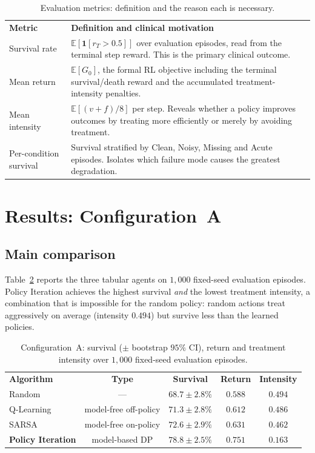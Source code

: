\documentclass[11pt,a4paper]{article}
\newcommand{\tH}[1]{\textcolor{novagreen}{\textbf{#1}}}
\newcommand{\gmid}{\arrayrulecolor{novagreen}\midrule\arrayrulecolor{black}}
\begin{document}
\begin{table}[H]
\centering
\begin{tabularx}{\textwidth}{>{\raggedright\arraybackslash}p{}X}
\toprule
\tH{Metric} & \tH{Definition and clinical motivation} \\
\gmid
Survival rate & $\mathbb{E}[\mathbf{1}[r_T>0.5]]$ over evaluation episodes, read
from the terminal step reward. This is the primary clinical outcome. \\
Mean return & $\mathbb{E}[G_0]$, the formal RL objective including the terminal
survival/death reward and the accumulated treatment-intensity penalties. \\
Mean intensity & $\mathbb{E}[(v+f)/8]$ per step. Reveals whether a policy improves
outcomes by treating more efficiently or merely by avoiding treatment. \\
Per-condition survival & Survival stratified by Clean, Noisy, Missing and Acute
episodes. Isolates which failure mode causes the greatest degradation. \\
\bottomrule
\end{tabularx}
\caption{Evaluation metrics: definition and the reason each is necessary.}
\label{tab:metrics}
\end{table}


\section{Results: Configuration~A}
\label{sec:resA}

\subsection{Main comparison}

Table~\ref{tab:configA} reports the three tabular agents on $1{,}000$ fixed-seed
evaluation episodes. Policy Iteration achieves the highest survival \emph{and} the
lowest treatment intensity, a combination that is impossible for the random policy:
random actions treat aggressively on average (intensity $0.494$) but survive less
than the learned policies.

\begin{table}[H]
\centering
\begin{tabular}{lcccc}
\toprule
\tH{Algorithm} & \tH{Type} & \tH{Survival} & \tH{Return} & \tH{Intensity} \\
\gmid
Random            & ---                   & $68.7\pm2.8\%$ & $0.588$ & $0.494$ \\
Q-Learning        & model-free off-policy & $71.3\pm2.8\%$ & $0.612$ & $0.486$ \\
SARSA             & model-free on-policy  & $72.6\pm2.9\%$ & $0.631$ & $0.462$ \\
\textbf{Policy Iteration} & model-based DP & $\mathbf{78.8\pm2.5\%}$ & $\mathbf{0.751}$ & $\mathbf{0.163}$ \\
\bottomrule
\end{tabular}
\caption{Configuration~A: survival ($\pm$ bootstrap $95\%$ CI), return and
treatment intensity over $1{,}000$ fixed-seed evaluation episodes.}
\label{tab:configA}
\end{table}
\end{document}
